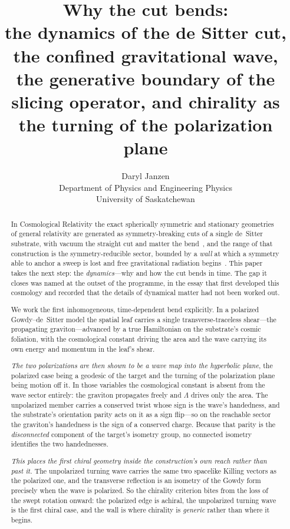 \documentclass[11pt,a4paper]{article}
\title{Why the cut bends:\\
\large the dynamics of the de Sitter cut, the confined gravitational wave,\\
the generative boundary of the slicing operator, and chirality as the turning of the polarization plane}
\author{Daryl Janzen\\
\small Department of Physics and Engineering Physics\\
\small University of Saskatchewan}
\date{}
\theoremstyle{plain}
\theoremstyle{definition}
\theoremstyle{remark}
\begin{document}
\maketitle

\begin{abstract}
In Cosmological Relativity the exact spherically symmetric and stationary geometries of general relativity are generated as symmetry-breaking cuts of a single de~Sitter substrate, with vacuum the straight cut and matter the bend~\cite{JanzenOperator}, and the range of that construction is the symmetry-reducible sector, bounded by a \emph{wall} at which a symmetry able to anchor a sweep is lost and free gravitational radiation begins~\cite{JanzenRange}. This paper takes the next step: the \emph{dynamics}---why and how the cut bends in time. The gap it closes was named at the outset of the programme, in the essay that first developed this cosmology and recorded that the details of dynamical matter had not been worked out.

We work the first inhomogeneous, time-dependent bend explicitly. In a polarized Gowdy--de~Sitter model the spatial leaf carries a single transverse-traceless shear---the propagating graviton---advanced by a true Hamiltonian on the substrate's cosmic foliation, with the cosmological constant driving the area and the wave carrying its own energy and momentum in the leaf's shear.

\emph{The two polarizations are then shown to be a wave map into the hyperbolic plane}, the polarized case being a geodesic of the target and the turning of the polarization plane being motion off it. In those variables the cosmological constant is absent from the wave sector entirely: the graviton propagates freely and $\Lambda$ drives only the area. The unpolarized member carries a conserved twist whose sign is the wave's handedness, and the substrate's orientation parity acts on it as a sign flip---so on the reachable sector the graviton's handedness is the sign of a conserved charge. Because that parity is the \emph{disconnected} component of the target's isometry group, no connected isometry identifies the two handednesses.

\emph{This places the first chiral geometry inside the construction's own reach rather than past it.} The unpolarized turning wave carries the same two spacelike Killing vectors as the polarized one, and the transverse reflection is an isometry of the Gowdy form precisely when the wave is polarized. So the chirality criterion bites from the loss of the swept rotation onward: the polarized edge is achiral, the unpolarized turning wave is the first chiral case, and the wall is where chirality is \emph{generic} rather than where it begins.


\end{abstract}
\end{document}
